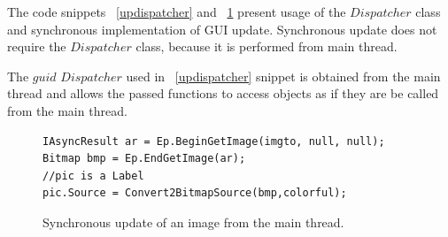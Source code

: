   The code snippets ~\ref{updispatcher} and ~\ref{upsynchronous} present usage of the $Dispatcher$ class and 
  synchronous implementation of GUI update. Synchronous update does not require the $Dispatcher$ class,
  because it is performed from main thread.

  The $guid$ $Dispatcher$ used in ~\ref{updispatcher} snippet is obtained from the main thread and
  allows the passed functions to access objects as if they are be called from the main thread.

\begin{figure}[!hbp]
\begin{lstlisting}
IAsyncResult ar = Ep.BeginGetImage(imgto, null, null);
Bitmap bmp = Ep.EndGetImage(ar);
//pic is a Label
pic.Source = Convert2BitmapSource(bmp,colorful);
\end{lstlisting}
\caption{Synchronous update of an image from the main thread.}
\label{upsynchronous}
\end{figure}
